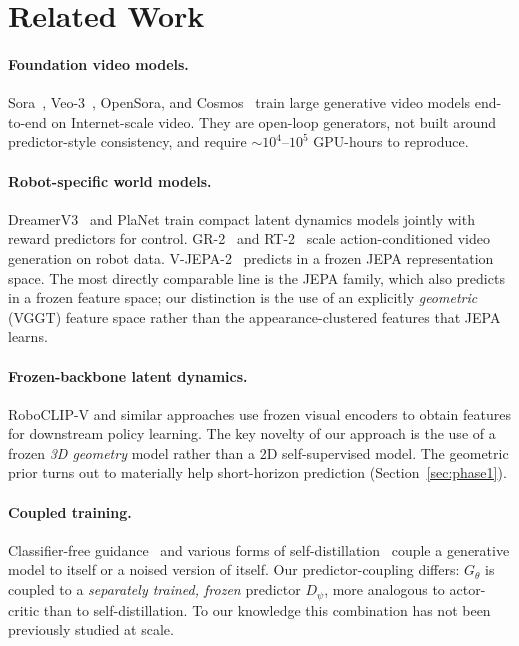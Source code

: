 \documentclass[10pt,letterpaper]{article}
\begin{document}
\section{Related Work}

\paragraph{Foundation video models.}
Sora~\citep{openai_sora_2024}, Veo-3~\citep{deepmind_veo3_2024}, OpenSora, and Cosmos~\citep{cosmos_2024} train large generative video models end-to-end on Internet-scale video. They are open-loop generators, not built around predictor-style consistency, and require $\sim 10^4$--$10^5$ GPU-hours to reproduce.

\paragraph{Robot-specific world models.}
DreamerV3~\citep{dreamerv3_2023} and PlaNet train compact latent dynamics models jointly with reward predictors for control. GR-2~\citep{gr2_2024} and RT-2~\citep{rt2_2023} scale action-conditioned video generation on robot data. V-JEPA-2~\citep{vjepa_2024} predicts in a frozen JEPA representation space. The most directly comparable line is the JEPA family, which also predicts in a frozen feature space; our distinction is the use of an explicitly \emph{geometric} (VGGT) feature space rather than the appearance-clustered features that JEPA learns.

\paragraph{Frozen-backbone latent dynamics.}
RoboCLIP-V and similar approaches use frozen visual encoders to obtain features for downstream policy learning. The key novelty of our approach is the use of a frozen \emph{3D geometry} model rather than a 2D self-supervised model. The geometric prior turns out to materially help short-horizon prediction (Section~\ref{sec:phase1}).

\paragraph{Coupled training.}
Classifier-free guidance~\citep{cfg_2022} and various forms of self-distillation~\citep{karras_2024} couple a generative model to itself or a noised version of itself. Our predictor-coupling differs: $G_\theta$ is coupled to a \emph{separately trained, frozen} predictor $D_\psi$, more analogous to actor-critic than to self-distillation. To our knowledge this combination has not been previously studied at scale.
\end{document}
